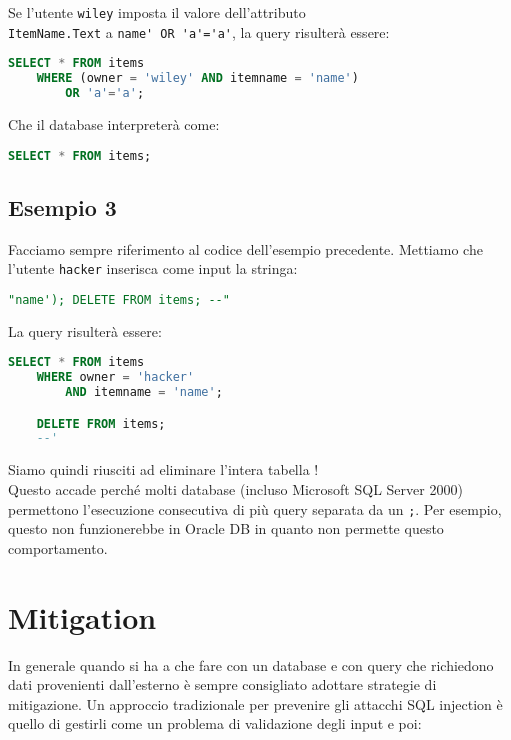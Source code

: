 Se l'utente \verb|wiley| imposta il valore dell'attributo\\
\verb|ItemName.Text| a \verb|name' OR 'a'='a'|, la query risulterà essere:

\begin{lstlisting}[language=SQL]
    SELECT * FROM items
    WHERE (owner = 'wiley' AND itemname = 'name')
        OR 'a'='a';
\end{lstlisting}

Che il database interpreterà come:

\begin{lstlisting}[language=SQL]
    SELECT * FROM items;
\end{lstlisting}

\subsection{Esempio 3}

Facciamo sempre riferimento al codice dell'esempio precedente.
Mettiamo che l'utente \verb|hacker| inserisca come input la stringa:

\begin{lstlisting}[language=SQL]
    "name'); DELETE FROM items; --"
\end{lstlisting}

La query risulterà essere:

\begin{lstlisting}[language=SQL]
    SELECT * FROM items
    WHERE owner = 'hacker'
        AND itemname = 'name';

    DELETE FROM items;
    --'
\end{lstlisting}

Siamo quindi riusciti ad eliminare l'intera tabella !\\
Questo accade perché molti database (incluso Microsoft SQL Server 2000)
permettono l'esecuzione consecutiva di più query separata da un \verb|;|.
Per esempio, questo non funzionerebbe in Oracle DB in quanto non permette questo
comportamento.

\section{Mitigation}

In generale quando si ha a che fare con un database e con query che richiedono dati
provenienti dall'esterno è sempre consigliato adottare strategie di mitigazione.
Un approccio tradizionale per prevenire gli attacchi SQL injection è quello di
gestirli come un
problema di validazione degli input e poi:

